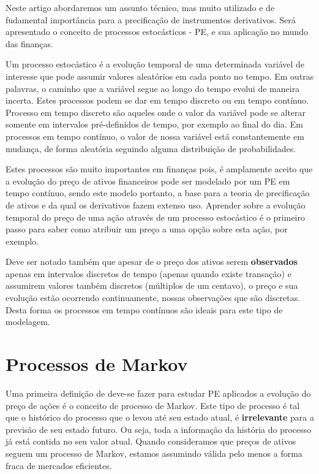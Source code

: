 \documentclass[]{book}
\begin{document}
Neste artigo abordaremos um assunto técnico, mas muito utilizado e de
fudamental importância para a precificação de instrumentos derivativos.
Será apresentado o conceito de processos estocásticos - PE, e sua
aplicação no mundo das finanças.

Um processo estocástico é a evolução temporal de uma determinada
variável de interesse que pode assumir valores aleatórios em cada ponto
no tempo. Em outras palavras, o caminho que a variável segue ao longo do
tempo evolui de maneira incerta. Estes processos podem se dar em tempo
discreto ou em tempo contínuo. Processo em tempo discreto são aqueles
onde o valor da variável pode se alterar somente em intervalos
pré-definidos de tempo, por exemplo ao final do dia. Em processos em
tempo contínuo, o valor de nossa variável está constantemente em
mudança, de forma aleatória seguindo alguma distribuição de
probabilidades.

Estes processos são muito importantes em finanças pois, é amplamente
aceito que a evolução do preço de ativos financeiros pode ser modelado
por um PE em tempo contínuo, sendo este modelo portanto, a base para a
teoria de precificação de ativos e da qual os derivativos fazem extenso
uso. Aprender sobre a evolução temporal do preço de uma ação através de
um processo estocástico é o primeiro passo para saber como atribuir um
preço a uma opção sobre esta ação, por exemplo.

Deve ser notado também que apesar de o preço dos ativos serem
\textbf{observados} apenas em intervalos discretos de tempo (apenas
quando existe transação) e assumirem valores também discretos (múltiplos
de um centavo), o preço e sua evolução estão ocorrendo continuamente,
nossas observações que são discretas. Desta forma os processos em tempo
contínuos são ideais para este tipo de modelagem.

\section{Processos de Markov}\label{markov}

Uma primeira definição de deve-se fazer para estudar PE aplicados a
evolução do preço de ações é o conceito de processo de Markov. Este tipo
de processo é tal que o histórico do processo que o levou até seu estado
atual, é \textbf{irrelevante} para a previsão de seu estado futuro. Ou
seja, toda a informação da história do processo já está contida no seu
valor atual. Quando consideramos que preços de ativos seguem um processo
de Markov, estamos assumindo válida pelo menos a forma fraca de mercados
eficientes.
\end{document}
